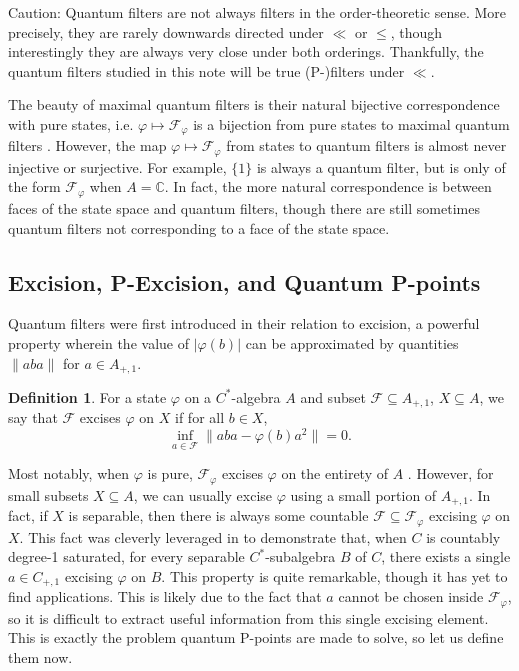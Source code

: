 \documentclass[10pt]{amsart}
\theoremstyle{definition}
\newtheorem{defn}[thm]{Definition}
\newcommand{\Fp}{\mathscr{F}_\varphi}
\begin{document}
Caution: Quantum filters are not always filters in the order-theoretic sense. More precisely, they are rarely downwards directed under $\ll$ or $\leq$, though interestingly they are always very close \cite[5.3.4]{FA19} under both orderings. Thankfully, the quantum filters studied in this note will be true (P-)filters under $\ll$.

The beauty of maximal quantum filters is their natural bijective correspondence with pure states, i.e. $\varphi\mapsto\Fp$ is a bijection from pure states to maximal quantum filters \cite[5.3.8]{FA19}. However, the map $\varphi\mapsto\Fp$ from states to quantum  filters is almost never injective or surjective. For example, $\{1\}$ is always a quantum filter, but is only of the form $\Fp$ when $A=\mathbb{C}$. In fact, the more natural correspondence is between faces of the state space and quantum filters, though there are still sometimes quantum filters not corresponding to a face of the state space.

\subsection{Excision, P-Excision, and Quantum P-points}

Quantum filters were first introduced in their relation to excision, a powerful property wherein the value of $|\varphi(b)|$ can be approximated by quantities $\|aba\|$ for  $a\in A_{+,1}$.

\begin{defn}
    For a state $\varphi$ on a $C^*$-algebra $A$ and subset $\mathscr{F}\subseteq A_{+,1}$, $X\subseteq A$, we say that $\mathscr{F}$ excises $\varphi$ on $X$ if for all $b\in X$,
    \[\inf_{a\in\mathscr{F}}\|aba-\varphi(b)a^2\|=0.\]
\end{defn}

Most notably, when $\varphi$ is pure, $\mathscr{F}_\varphi$ excises $\varphi$ on the entirety of $A$ \cite[5.2.1]{FA19}. However, for small subsets $X\subseteq A$, we can usually excise $\varphi$ using a small portion of $A_{+,1}$. In fact, if $X$ is separable, then there is always some countable $\mathscr{F}\subseteq\Fp$ excising $\varphi$ on $X$. This fact was cleverly leveraged in \cite[15.3.8]{FA19} to demonstrate that, when $C$ is countably degree-1 saturated, for every separable $C^*$-subalgebra $B$ of $C$, there exists a single $a\in C_{+,1}$ excising $\varphi$ on $B$. This property is quite remarkable, though it has yet to find applications. This is likely due to the fact that $a$ cannot be chosen inside $\Fp$, so it is difficult to extract useful information from this single excising element. This is exactly the problem quantum P-points are made to solve, so let us define them now.
\end{document}
